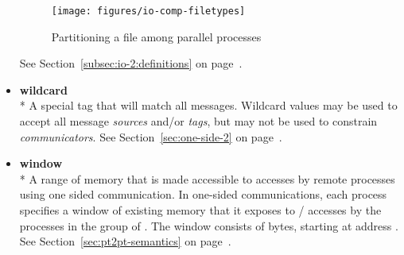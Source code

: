 \begin{itemize}
\begin{figure}[htpb]
  \centerline{\texttt{[image: figures/io-comp-filetypes]}}
  \caption{Partitioning a file among parallel processes}
  \label{fig:gloss-io-comp-filetypes}
\end{figure}
See Section~\ref{subsec:io-2:definitions} on page~\pageref{subsec:io-2:definitions}.

\label{glossary:wildcard}
\item \textbf{ wildcard} \\*
A special tag that will match all messages. Wildcard values may be used 
to accept all message \emph{sources} and/or \emph{tags}, but may not be used to 
constrain \emph{communicators}.
See Section~\ref{sec:one-side-2} on page~\pageref{sec:one-side-2}.

\label{glossary:window}
\item \textbf{ window} \\*
A range of memory that is made accessible to accesses by remote 
processes using one sided communication. 
In one-sided communications, each process specifies
a window of existing memory that it exposes to \RMA/ accesses by the
processes in the group of  .
The window consists of  bytes,
starting at address .
See Section~\ref{sec:pt2pt-semantics} on page~\pageref{sec:pt2pt-semantics}.


\end{itemize}